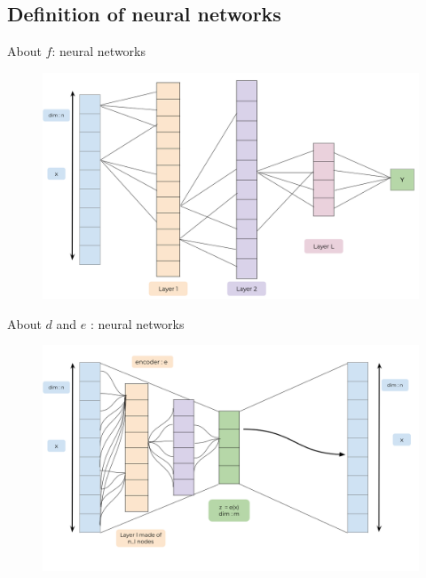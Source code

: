 \documentclass[compress,10pt]{beamer}
\begin{document}
\subsection{Definition of neural networks}
\begin{frame}{About \(f\): neural networks}
\protect\hypertarget{about-f-neural-networks}{}
\begin{figure}

{\centering \includegraphics[width=0.9\linewidth]{images/NeuralNetwork} 
}
\end{figure}
\end{frame}



\begin{frame}{About \(d\) and \(e\) : neural networks}
\protect\hypertarget{about-d-and-e-neural-networks}{}
\begin{figure}

{\centering \includegraphics[width=0.9\linewidth]{images/Autoencoder2} 

}
\end{figure}
\end{frame}
\end{document}
